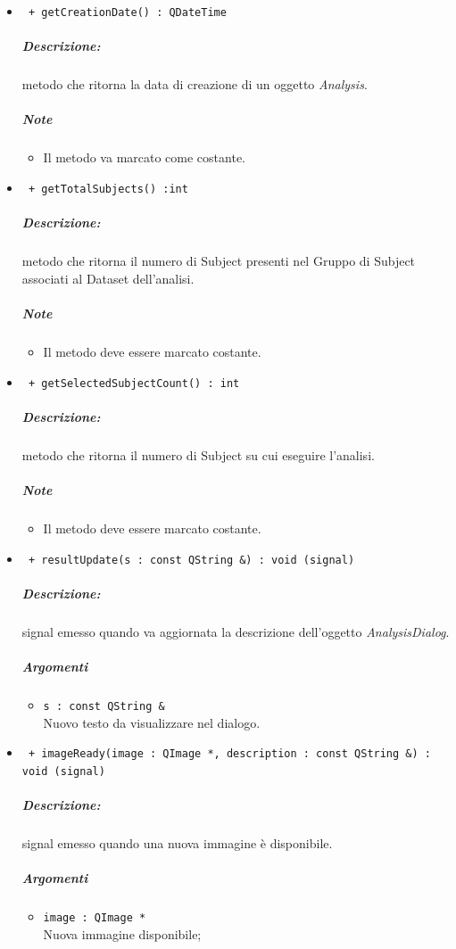 \begin{itemize}
	\item \color{blue}\verb! + getCreationDate() : QDateTime!\\
	\color{black}\subparagraph{Descrizione:} metodo che ritorna la data di creazione di un oggetto \textsl{Analysis}.
	\subparagraph{Note}
	\begin{itemize}
		\item Il metodo va marcato come costante.
	\end{itemize}
	
	\item \color{blue}\verb! + getTotalSubjects() :int!\\
	\color{black}\subparagraph{Descrizione:} metodo che ritorna il numero di Subject\g{} presenti nel Gruppo di Subject associati al Dataset\g{} dell'analisi.
	\subparagraph{Note}
		\begin{itemize}
			\item Il metodo deve essere marcato costante.
		\end{itemize}
		
	\item \color{blue}\verb! + getSelectedSubjectCount() : int!\\
	\color{black}\subparagraph{Descrizione:} metodo che ritorna il numero di Subject\g{} su cui eseguire l'analisi.
	\subparagraph{Note}
		\begin{itemize}
			\item Il metodo deve essere marcato costante.
		\end{itemize}
		
	\item \color{blue}\verb! + resultUpdate(s : const QString &) : void (signal)!\\    
	\color{black}\subparagraph{Descrizione:} signal\g{} emesso quando va aggiornata la descrizione dell'oggetto \textsl{AnalysisDialog}.
	\subparagraph{Argomenti}
		\begin{itemize}
			\item \color{RoyalPurple}\verb!s : const QString &!\\
			\color{black}Nuovo testo da visualizzare nel dialogo.
		\end{itemize}   
		
	\item \color{blue}\verb! + imageReady(image : QImage *, description : const QString &) : void (signal)!\\
	\color{black}\subparagraph{Descrizione:} signal\g{} emesso quando una nuova immagine è disponibile.
	\subparagraph{Argomenti}
		\begin{itemize}
			\item \color{RoyalPurple}\verb!image : QImage *!\\
			\color{black}Nuova immagine disponibile;
			

\end{itemize}
\end{itemize}
